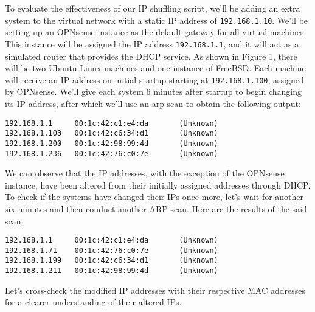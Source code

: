 To evaluate the effectiveness of our IP shuffling script, we'll be adding an extra system to the virtual network with a static IP address of \texttt{192.168.1.10}. We'll be setting up an OPNsense instance as the default gateway for all virtual machines. This instance will be assigned the IP address \texttt{192.168.1.1}, and it will act as a simulated router that provides the DHCP service. As shown in Figure 1, there will be two Ubuntu Linux machines and one instance of FreeBSD. Each machine will receive an IP address on initial startup starting at \texttt{192.168.1.100}, assigned by OPNsense. We'll give each system 6 minutes after startup to begin changing its IP address, after which we'll use an arp-scan to obtain the following output:
\begin{verbatim}
192.168.1.1     00:1c:42:c1:e4:da       (Unknown)
192.168.1.103   00:1c:42:c6:34:d1       (Unknown)
192.168.1.200   00:1c:42:98:99:4d       (Unknown)
192.168.1.236   00:1c:42:76:c0:7e       (Unknown)
\end{verbatim}
We can observe that the IP addresses, with the exception of the OPNsense instance, have been altered from their initially assigned addresses through DHCP. To check if the systems have changed their IPs once more, let's wait for another six minutes and then conduct another ARP scan. Here are the results of the said scan:
\begin{verbatim}
192.168.1.1     00:1c:42:c1:e4:da       (Unknown)
192.168.1.71    00:1c:42:76:c0:7e       (Unknown)
192.168.1.199   00:1c:42:c6:34:d1       (Unknown)
192.168.1.211   00:1c:42:98:99:4d       (Unknown)
\end{verbatim}
Let's cross-check the modified IP addresses with their respective MAC addresses for a clearer understanding of their altered IPs.

